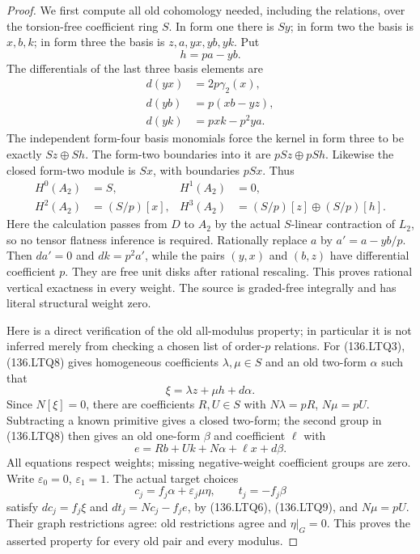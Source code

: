 \begin{proof}
We first compute all old cohomology needed, including the
relations, over the torsion-free coefficient ring \(S\).
In form one there is \(S y\); in form two the basis is
\(x,b,k\); in form three the basis is
\(z,a,yx,yb,yk\).  Put
\[
                              h=p a-yb.
\]
The differentials of the last three basis elements are
\[
 \begin{aligned}
 d(yx)&=2p\gamma_2(x),\\
 d(yb)&=p(xb-yz),\\
 d(yk)&=p xk-p^2ya.
 \end{aligned}
                                                        \tag{136.LTQ7}
\]
The independent form-four basis monomials force the kernel
in form three to be exactly \(S z\oplus S h\).
The form-two boundaries into it are \(pS z\oplus pS h\).
Likewise the closed form-two module is \(Sx\), with
boundaries \(pSx\).  Thus
\[
 \begin{aligned}
 H^0(A_2)&=S,& H^1(A_2)&=0,\\
 H^2(A_2)&=(S/p)[x],&
 H^3(A_2)&=(S/p)[z]\oplus(S/p)[h].
 \end{aligned}
                                                        \tag{136.LTQ8}
\]
Here the calculation passes from \(D\) to \(A_2\)
by the actual \(S\)-linear contraction of \(L_2\),
so no tensor flatness inference is required.  Rationally
replace \(a\) by \(a'=a-yb/p\).  Then \(da'=0\)
and \(dk=p^2a'\), while the pairs \((y,x)\) and
\((b,z)\) have differential coefficient \(p\).
They are free unit disks after rational rescaling.  This
proves rational vertical exactness in every weight.  The
source is graded-free integrally and has literal structural
weight zero.

Here is a direct verification of the old all-modulus property;
in particular it is not inferred merely from checking a chosen
list of order-\(p\) relations.  For (136.LTQ3), (136.LTQ8)
gives homogeneous coefficients \(\lambda,\mu\in S\)
and an old two-form \(\alpha\) such that
\[
                         \xi=\lambda z+\mu h+d\alpha.
\]
Since \(N[\xi]=0\), there are coefficients
\(R,U\in S\) with \(N\lambda=pR\),
\(N\mu=pU\).  Subtracting a known primitive gives
a closed two-form; the second group in (136.LTQ8) then gives
an old one-form \(\beta\) and coefficient \(\ell\)
with
\[
                   e=Rb+Uk+N\alpha+\ell x+d\beta.
                                                        \tag{136.LTQ9}
\]
All equations respect weights; missing negative-weight
coefficient groups are zero.  Write \(\varepsilon_0=0\),
\(\varepsilon_1=1\).  The actual target choices
\[
 c_j=f_j\alpha+\varepsilon_j\mu\eta,
                      \qquad t_j=-f_j\beta
                                                        \tag{136.LTQ10}
\]
satisfy \(dc_j=f_j\xi\) and
\(dt_j=Nc_j-f_je\), by (136.LTQ6), (136.LTQ9),
and \(N\mu=pU\).  Their graph restrictions agree:
old restrictions agree and \(\eta|_G=0\).  This proves
the asserted property for every old pair and every modulus.


\end{proof}
